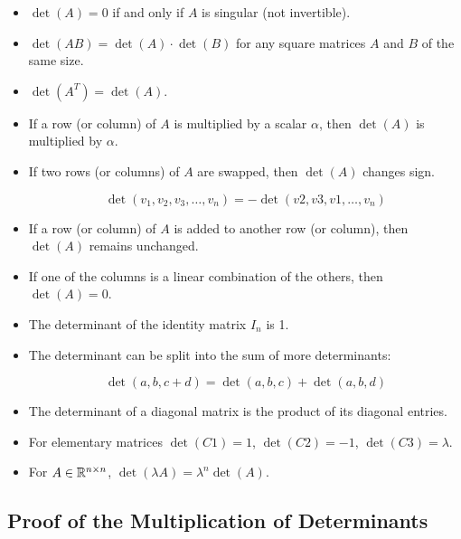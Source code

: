 \begin{itemize}

    \item \(\det(A) = 0\) if and only if \(A\) is singular (not invertible).

    \item \(\det(AB) = \det(A) \cdot \det(B)\) for any square matrices \(A\) and \(B\) of the same size.

    \item \(\det(A^T) = \det(A)\).

    \item If a row (or column) of \(A\) is multiplied by a scalar \(\alpha\), then \(\det(A)\) is multiplied by \(\alpha\).

    \item If two rows (or columns) of \(A\) are swapped, then \(\det(A)\) changes sign.

    \[
        \det(v_1, v_2, v_3, \dots, v_n)  = - \det(v2, v3, v1, \dots, v_n)   
    \] 
    
    \item If a row (or column) of \(A\) is added to another row (or column), then \(\det(A)\) remains unchanged.

    \item If one of the columns is a linear combination of the others, then \(\det(A) = 0\).

    \item The determinant of the identity matrix \(I_n\) is 1.

    \item The determinant can be split into the sum of more determinants:

          \[
              \det(a,b,c + d) = \det(a,b,c) + \det(a,b,d)
          \]

    \item The determinant of a diagonal matrix is the product of its diagonal entries.

    \item For elementary matrices \(\det(C1) = 1\), \(\det(C2) = -1\), \(\det(C3) = \lambda\).

    \item For \(A \in \mathbb{R}^{n\times n}\), \(\det(\lambda A) = \lambda^n \det(A)\).

\end{itemize}

\subsection{Proof of the Multiplication of Determinants}

